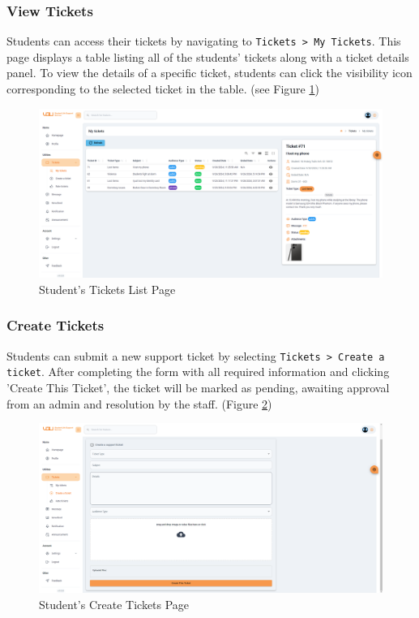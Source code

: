 	
	\subsubsection{View Tickets}

	Students can access their tickets by navigating to \texttt{Tickets > My Tickets}. This page displays a table listing all of the students' tickets along with a ticket details panel. To view the details of a specific ticket, students can click the visibility icon corresponding to the selected ticket in the table. (see Figure \ref{fig:gui-std-my-tickets})
	\begin{figure}[H]
		\centering
		\includegraphics[width=1.0\linewidth]{graphics/gui/student/my-tickets}
		\caption{Student's Tickets List Page}
		\label{fig:gui-std-my-tickets}
	\end{figure}
	
	
	\subsubsection{Create Tickets}
	Students can submit a new support ticket by selecting \texttt{Tickets > Create a ticket}. After completing the form with all required information and clicking 'Create This Ticket', the ticket will be marked as pending, awaiting approval from an admin and resolution by the staff. (Figure \ref{fig:gui-std-create-ticket})
	
	\begin{figure}[H]
		\centering
		\includegraphics[width=1.0\linewidth]{graphics/gui/student/create-ticket}
		\caption{Student's Create Tickets Page}
		\label{fig:gui-std-create-ticket}
	\end{figure}
	

